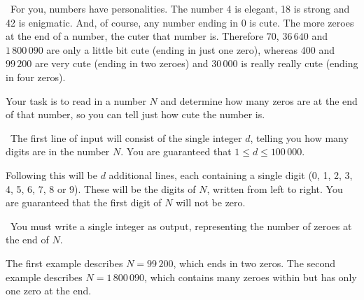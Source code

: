 

\Question\ \quad For you, numbers have personalities. The number
4 is elegant, 18 is strong and 42 is enigmatic.  And, of course, any number ending in 0 is
cute.  The more zeroes at the end of a number, the cuter that number is. Therefore $70$,
$36\,640$ and $1\,800\,090$ are only a little bit cute (ending in just one zero), whereas
400 and $99\,200$ are very cute (ending in two zeroes) and $30\,000$ is really really cute
(ending in four zeros).

Your task is to read in a number $N$ and determine how many zeros are at the end of that
number, so you can tell just how cute the number is.

\Input\ The first line of input will consist of the single integer $d$, telling you how
many digits are in the number $N$. You are guaranteed that $1 \le d \le 100\,000$.

Following this will be $d$ additional lines, each containing a single digit (0, 1, 2, 3,
4, 5, 6, 7, 8 or 9). These will be the digits of $N$, written from left to right. You are
guaranteed that the first digit of $N$ will not be zero.

\Output\ You must write a single integer as output, representing the number of zeroes at
the end of $N$.

\Sample



\Explanation The first example describes $N = 99\,200$, which ends in two zeros. The second
example describes $N = 1\,800\,090$, which contains many zeroes within but has only one zero
at the end.

